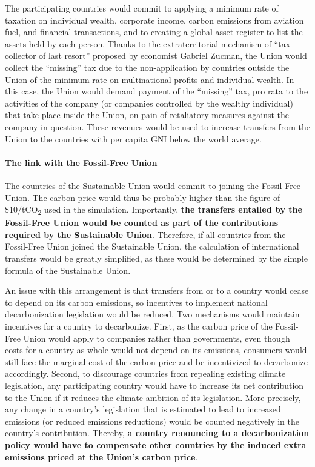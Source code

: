 \documentclass[12pt,english]{article}
\begin{document}
The participating countries would commit to applying a minimum rate of taxation on individual wealth, corporate income, carbon emissions from aviation fuel, and financial transactions, and to creating a global asset register to list the assets held by each person. 
Thanks to the extraterritorial mechanism of ``tax collector of last resort'' proposed by economist Gabriel Zucman,\cite{zucman_blueprint_2024} the Union would collect the ``missing'' tax due to the non-application by countries outside the Union of the minimum rate on multinational profits and individual wealth. In this case, the Union would demand payment of the ``missing'' tax, pro rata to the activities of the company (or companies controlled by the wealthy individual) that take place inside the Union, on pain of retaliatory measures against the company in question. These revenues would be used to increase transfers from the Union to the countries with per capita GNI below the world average. 

\paragraph{The link with the Fossil-Free Union}
The countries of the Sustainable Union would commit to joining the Fossil-Free Union. The carbon price would thus be probably higher than the figure of \$10/tCO\textsubscript{2} used in the simulation. Importantly, \textbf{the transfers entailed by the Fossil-Free Union would be counted as part of the contributions required by the Sustainable Union}. Therefore, if all countries from the Fossil-Free Union joined the Sustainable Union, the calculation of international transfers would be greatly simplified, as these would be determined by the simple formula of the Sustainable Union. 

An issue with this arrangement is that transfers from or to a country would cease to depend on its carbon emissions, so incentives to implement national decarbonization legislation would be reduced. Two mechanisms would maintain incentives for a country to decarbonize. First, as the carbon price of the Fossil-Free Union would apply to companies rather than governments, even though costs for a country as whole would not depend on its emissions, consumers would still face the marginal cost of the carbon price and be incentivized to decarbonize accordingly. Second, to discourage countries from repealing existing climate legislation, any participating country would have to increase its net contribution to the Union if it reduces the climate ambition of its legislation. More precisely, any change in a country's legislation that is estimated to lead to increased emissions (or reduced emissions reductions) would be counted negatively in the country's contribution. Thereby, \textbf{a country renouncing to a decarbonization policy would have to compensate other countries by the induced extra emissions priced at the Union's carbon price}.
\end{document}
